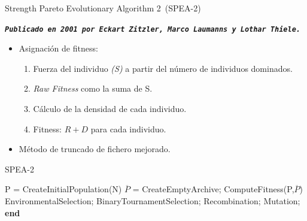 \documentclass[12pt]{beamer}
\begin{document}
\begin{frame}[fragile]{Strength Pareto Evolutionary Algorithm 2~(SPEA-2)}
\begin{center}
        \texttt{\textbf{\textit{Publicado en 2001 por Eckart Zitzler, Marco Laumanns y Lothar Thiele\cite{SPEA2}.}}}
\end{center}
\begin{itemize}
    \item Asignación de fitness:
    \begin{enumerate}
        \item Fuerza del individuo \textit{(S)} a partir del número de individuos dominados.
        \item \textit{Raw Fitness} como la suma de S.
        \item Cálculo de la densidad de cada individuo. 
        \item Fitness: $R + D$ para cada individuo.
    \end{enumerate}
    \item Método de truncado de fichero mejorado.
\end{itemize}
\end{frame}

\begin{frame}[fragile]{SPEA-2}
\begin{algorithm}[H]
\begin{algorithmic}[1]
\State P = CreateInitialPopulation(N)\;
\State $\overline{P}$ = CreateEmptyArchive;\;
    \State ComputeFitness(P,$\overline{P}$)
    \State EnvironmentalSelection;
    \State BinaryTournamentSelection;
    \State Recombination;
    \State Mutation;
  \EndWhile
  \State \textbf{end}
\end{algorithmic}
\caption{SPEA 2.}
\end{algorithm} 
\end{frame}
\end{document}

